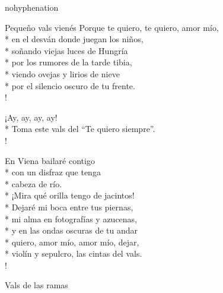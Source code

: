 \documentclass[
    a5paper,
    DIV=10,
    12pt,
    notitlepage,
    oneside,]
{scrbook} %
\begin{document}
\begin{hyphenrules}{nohyphenation}
\begin{poem}{Pequeño vals vienés}{}{\vspace{-1em}}
Porque te quiero, te quiero, amor mío,\\*
en el desván donde juegan los niños,\\*
soñando viejas luces de Hungría\\*
por los rumores de la tarde tibia,\\*
viendo ovejas y lirios de nieve\\*
por el silencio oscuro de tu frente.\\!

¡Ay, ay, ay, ay!\\*
Toma este vals del ``Te quiero siempre''.\\!

En Viena bailaré contigo\\*
con un disfraz que tenga\\*
cabeza de río.\\*
¡Mira qué orilla tengo de jacintos!\\*
Dejaré mi boca entre tus piernas,\\*
mi alma en fotografías y azucenas,\\*
y en las ondas oscuras de tu andar\\*
quiero, amor mío, amor mío, dejar,\\*
violín y sepulcro, las cintas del vals.\\!

\end{poem}

\begin{poem}{Vals de las ramas}{}{\vspace{-1em}}


\end{poem}
\end{hyphenrules}
\end{document}
